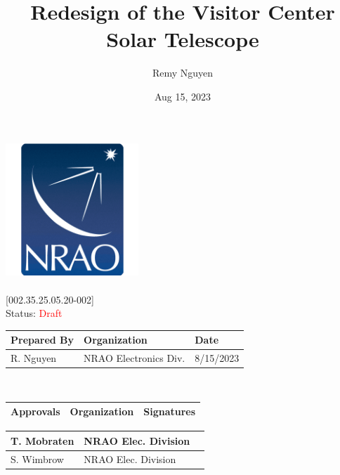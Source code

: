 \documentclass[titlepage]{article}
\title{Redesign of the Visitor Center Solar Telescope}
\author{Remy Nguyen
    }%
\date{Aug 15, 2023}
\def\docnum{[002.35.25.05.20-002]}
\def\status{\textcolor{red}{Draft}}
\renewcommand{\arraystretch}{1.4}
\begin{document}
\setlength{\leftmargin}{1in}        %
\setlength{\rightmargin}{1in}       %
\setlength{\voffset}{-1.2in}        %
\setlength{\headheight}{3.5cm}      %
\setlength{\textheight}{591pt}      %
\setlength{\footskip}{60pt}         %

\thispagestyle{fancy}
\begin{center}
     \includegraphics[width=5cm]{images/NRAO Logo Badge.png} \\
     \vspace*{0.5cm}
     \textbf{\huge\thetitle} \\
     \vspace*{0.5cm}
     \large\docnum \\
     \Large Status: \status \\
     \vspace*{1cm} \large
     \begin{tabular}{|m{6.93cm}|m{4.5cm}|m{2cm}|} \hline
        \rowcolor{nraoblue}
        \textbf{Prepared By} & \textbf{Organization} & \textbf{Date} \\ \hline
        R. Nguyen & NRAO Electronics Div. & 8/15/2023 \\ 
        \hline
    \end{tabular} \\
    \vspace*{1cm}
    \begin{tabular}{|m{3cm}|m{3.5cm}|m{6.93cm}|} \hline
        \rowcolor{nraoblue}
        \textbf{Approvals} & \textbf{Organization} & \textbf{Signatures} \\ \hline
    \end{tabular}
    \renewcommand{\arraystretch}{1.5}
    \begin{tabular}{|m{3cm}|m{3.5cm}|m{6.93cm}|}
        T. Mobraten & NRAO Elec. Division &  \\ 
        \hline
        S. Wimbrow & NRAO Elec. Division &  \\ 

\end{tabular}
\end{center}
\end{document}
